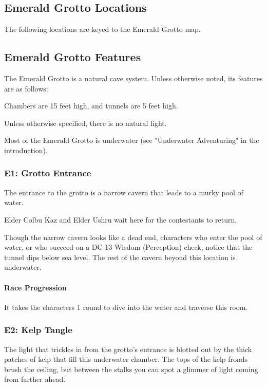 \documentclass[10pt,a4paper,twoside,bg=print,twocolumn,openany,nodeprecatedcode]{dndbook}
\begin{document}
\subsection{Emerald Grotto Locations}
The following locations are keyed to the Emerald Grotto map.




\subsection{Emerald Grotto Features}
The Emerald Grotto is a natural cave system. Unless otherwise noted, its features are as follows:


\begin{description}[nolistsep]
\item[Ceilings.]
Chambers are 15 feet high, and tunnels are 5 feet high.
\item[Light.]
Unless otherwise specified, there is no natural light.
\item[Water.]
Most of the Emerald Grotto is underwater (see "Underwater Adventuring" in the introduction).
\end{description}


\subsubsection{E1: Grotto Entrance}

\begin{DndReadAloud}{}
The entrance to the grotto is a narrow cavern that leads to a murky pool of water.
\end{DndReadAloud}

Elder Colbu Kaz and Elder Ushru wait here for the contestants to return.

Though the narrow cavern looks like a dead end, characters who enter the pool of water, or who succeed on a DC 13 Wisdom (Perception) check, notice that the tunnel dips below sea level. The rest of the cavern beyond this location is underwater.

\paragraph{Race Progression}
It takes the characters 1 round to dive into the water and traverse this room.

\subsubsection{E2: Kelp Tangle}
\begin{DndReadAloud}{}
The light that trickles in from the grotto's entrance is blotted out by the thick patches of kelp that fill this underwater chamber. The tops of the kelp fronds brush the ceiling, but between the stalks you can spot a glimmer of light coming from farther ahead.

\end{DndReadAloud}
\end{document}
